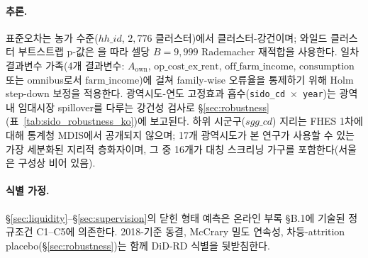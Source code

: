 \documentclass[12pt, a4paper]{article}
\begin{document}
\paragraph{추론.} 표준오차는 농가 수준($hh\_id$, $2{,}776$ 클러스터)에서 클러스터-강건이며; 와일드 클러스터 부트스트랩 p-값은 \citet{CameronGelbachMiller2008_clusterboot}을 따라 셀당 $B = 9{,}999$ Rademacher 재적합을 사용한다. 일차 결과변수 가족(4개 결과변수: $A_{\text{own}}$, $\text{op\_cost\_ex\_rent}$, $\text{off\_farm\_income}$, $\text{consumption}$ 또는 omnibus로서 $\text{farm\_income}$)에 걸쳐 family-wise 오류율을 통제하기 위해 Holm step-down 보정을 적용한다. 광역시도-연도 고정효과 흡수(\texttt{sido\_cd}~$\times$~\texttt{year})는 광역 내 임대시장 spillover를 다루는 강건성 검사로 \S\ref{sec:robustness}(표~\ref{tab:sido_robustness_ko})에 보고된다. 하위 시군구($sgg\_cd$) 지리는 FHES 1차에 대해 통계청 MDIS에서 공개되지 않으며; 17개 광역시도가 본 연구가 사용할 수 있는 가장 세분화된 지리적 층화자이며, 그 중 16개가 대칭 스크리닝 가구를 포함한다(서울은 구성상 비어 있음).

\paragraph{식별 가정.} \S\ref{sec:liquidity}--\S\ref{sec:supervision}의 닫힌 형태 예측은 온라인 부록 \S B.1에 기술된 정규조건 C1--C5에 의존한다. 2018-기준 동결, McCrary 밀도 연속성, 차등-attrition placebo(\S\ref{sec:robustness})는 함께 DiD-RD 식별을 뒷받침한다.
\end{document}
